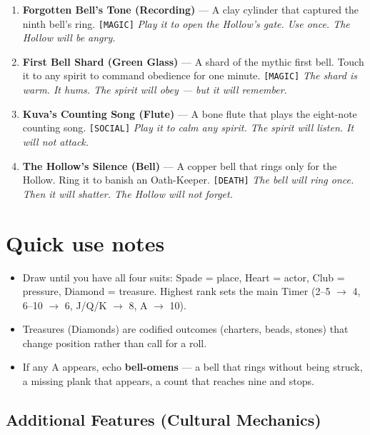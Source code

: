 \begin{enumerate}
\item[J] \textbf{Forgotten Bell's Tone (Recording)} --- A clay cylinder that captured the ninth bell's ring. \texttt{[MAGIC]}
  \hfill \textit{Play it to open the Hollow's gate. Use once. The Hollow will be angry.}
\item[Q] \textbf{First Bell Shard (Green Glass)} --- A shard of the mythic first bell. Touch it to any spirit to command obedience for one minute. \texttt{[MAGIC]}
  \hfill \textit{The shard is warm. It hums. The spirit will obey --- but it will remember.}
\item[K] \textbf{Kuva's Counting Song (Flute)} --- A bone flute that plays the eight-note counting song. \texttt{[SOCIAL]}
  \hfill \textit{Play it to calm any spirit. The spirit will listen. It will not attack.}
\item[A] \textbf{The Hollow's Silence (Bell)} --- A copper bell that rings only for the Hollow. Ring it to banish an Oath-Keeper. \texttt{[DEATH]}
  \hfill \textit{The bell will ring once. Then it will shatter. The Hollow will not forget.}
\end{enumerate}

\section*{Quick use notes}
\label{sec:aelinnel-quick-use}
\begin{itemize}
\item Draw until you have all four suits: Spade = place, Heart = actor, Club = pressure, Diamond = treasure. Highest rank sets the main Timer (2--5 $\rightarrow$ 4, 6--10 $\rightarrow$ 6, J/Q/K $\rightarrow$ 8, A $\rightarrow$ 10).
\item Treasures (Diamonds) are codified outcomes (charters, beads, stones) that change position rather than call for a roll.
\item If any A appears, echo \textbf{bell-omens} --- a bell that rings without being struck, a missing plank that appears, a count that reaches nine and stops.
\end{itemize}

\subsection*{Additional Features (Cultural Mechanics)}
\label{sec:aelinnel-mechanics}

